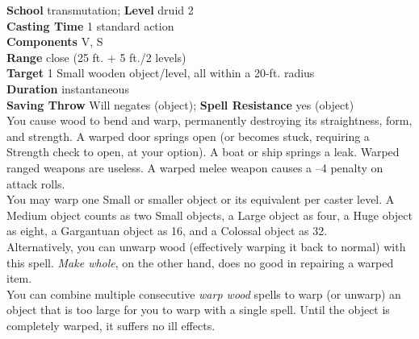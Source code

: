 \textbf{School} transmutation; \textbf{Level} druid 2\\
\textbf{Casting Time} 1 standard action\\
\textbf{Components} V, S\\
\textbf{Range} close (25 ft. + 5 ft./2 levels)\\
\textbf{Target} 1 Small wooden object/level, all within a 20-ft. radius\\
\textbf{Duration} instantaneous\\
\textbf{Saving Throw }Will negates (object); \textbf{Spell Resistance} yes (object)\\
You cause wood to bend and warp, permanently destroying its straightness, form, and strength. A warped door springs open (or becomes stuck, requiring a Strength check to open, at your option). A boat or ship springs a leak. Warped ranged weapons are useless. A warped melee weapon causes a --4 penalty on attack rolls.\\
You may warp one Small or smaller object or its equivalent per caster level. A Medium object counts as two Small objects, a Large object as four, a Huge object as eight, a Gargantuan object as 16, and a Colossal object as 32.\\
Alternatively, you can unwarp wood (effectively warping it back to normal) with this spell. \textit{Make whole}, on the other hand, does no good in repairing a warped item.\\
You can combine multiple consecutive \textit{warp wood }spells to warp (or unwarp) an object that is too large for you to warp with a single spell. Until the object is completely warped, it suffers no ill effects.\\
